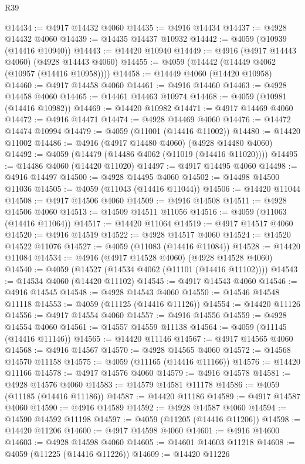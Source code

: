 \begin{lexlean}{R39}
\begin{coremodule}
@14434 := @4917 @14432 @4060
@14435 := @4916 @14434
@14437 := @4928 @14432 @4060
@14439 := @14435 @14437 @10932
@14442 := @4059 (@10939 (@14416 @10940))
@14443 := @14420 @10940
@14449 := @4916 (@4917 @14443 @4060) (@4928 @14443 @4060)
@14455 := @4059 (@14442 (@14449 @4062 (@10957 (@14416 @10958))))
@14458 := @14449 @4060 (@14420 @10958)
@14460 := @4917 @14458 @4060
@14461 := @4916 @14460
@14463 := @4928 @14458 @4060
@14465 := @14461 @14463 @10974
@14468 := @4059 (@10981 (@14416 @10982))
@14469 := @14420 @10982
@14471 := @4917 @14469 @4060
@14472 := @4916 @14471
@14474 := @4928 @14469 @4060
@14476 := @14472 @14474 @10994
@14479 := @4059 (@11001 (@14416 @11002))
@14480 := @14420 @11002
@14486 := @4916 (@4917 @14480 @4060) (@4928 @14480 @4060)
@14492 := @4059 (@14479 (@14486 @4062 (@11019 (@14416 @11020))))
@14495 := @14486 @4060 (@14420 @11020)
@14497 := @4917 @14495 @4060
@14498 := @4916 @14497
@14500 := @4928 @14495 @4060
@14502 := @14498 @14500 @11036
@14505 := @4059 (@11043 (@14416 @11044))
@14506 := @14420 @11044
@14508 := @4917 @14506 @4060
@14509 := @4916 @14508
@14511 := @4928 @14506 @4060
@14513 := @14509 @14511 @11056
@14516 := @4059 (@11063 (@14416 @11064))
@14517 := @14420 @11064
@14519 := @4917 @14517 @4060
@14520 := @4916 @14519
@14522 := @4928 @14517 @4060
@14524 := @14520 @14522 @11076
@14527 := @4059 (@11083 (@14416 @11084))
@14528 := @14420 @11084
@14534 := @4916 (@4917 @14528 @4060) (@4928 @14528 @4060)
@14540 := @4059 (@14527 (@14534 @4062 (@11101 (@14416 @11102))))
@14543 := @14534 @4060 (@14420 @11102)
@14545 := @4917 @14543 @4060
@14546 := @4916 @14545
@14548 := @4928 @14543 @4060
@14550 := @14546 @14548 @11118
@14553 := @4059 (@11125 (@14416 @11126))
@14554 := @14420 @11126
@14556 := @4917 @14554 @4060
@14557 := @4916 @14556
@14559 := @4928 @14554 @4060
@14561 := @14557 @14559 @11138
@14564 := @4059 (@11145 (@14416 @11146))
@14565 := @14420 @11146
@14567 := @4917 @14565 @4060
@14568 := @4916 @14567
@14570 := @4928 @14565 @4060
@14572 := @14568 @14570 @11158
@14575 := @4059 (@11165 (@14416 @11166))
@14576 := @14420 @11166
@14578 := @4917 @14576 @4060
@14579 := @4916 @14578
@14581 := @4928 @14576 @4060
@14583 := @14579 @14581 @11178
@14586 := @4059 (@11185 (@14416 @11186))
@14587 := @14420 @11186
@14589 := @4917 @14587 @4060
@14590 := @4916 @14589
@14592 := @4928 @14587 @4060
@14594 := @14590 @14592 @11198
@14597 := @4059 (@11205 (@14416 @11206))
@14598 := @14420 @11206
@14600 := @4917 @14598 @4060
@14601 := @4916 @14600
@14603 := @4928 @14598 @4060
@14605 := @14601 @14603 @11218
@14608 := @4059 (@11225 (@14416 @11226))
@14609 := @14420 @11226

\end{coremodule}
\end{lexlean}
